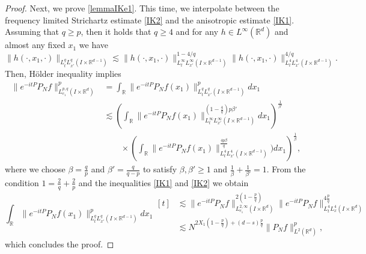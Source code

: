 \documentclass[aihp]{imsart}
\numberwithin{equation}{section}
\theoremstyle{plain}
\theoremstyle{remark}
\newcommand{\R}{\mathbb{R}}
\begin{document}
\begin{proof}
Next, we prove  \eqref{lemmaIKe1}. This time, we interpolate between the frequency limited Strichartz estimate \eqref{IK2} and the anisotropic estimate \eqref{IK1}. Assuming that $q \geq p$, then it holds that $q \geq 4$ and for any $h\in L^\infty (\R^d )$ and almost any fixed \(x_{1}\) we have
$$\|h (\cdot,x_{1},\cdot)\|_{L^q_{t}L^{q}_{x'} (I\times \R^{d-1})} \lesssim \|h(\cdot,x_{1},\cdot) \|_{L^\infty_{t}L^{\infty}_{x'} (I\times \R^{d-1} )}^{1-4/q} \|h(\cdot,x_{1},\cdot)\|_{L^4_{t}L^{4}_{x'} (I\times \R^{d-1} )}^{4/q}.$$
Then,  H\" older inequality implies
\begin{align*}
\big\|e^{-it P } P_N  f\big\|_{L^{p,q}_{e_{1}} (I\times\R^{d})}^{p}
&= \int_{\R} \big\|e^{-it P }  P_N f(x_{1}) \big\|_{L^q_{t}L^{q}_{x'} (I \times \R^{d-1})}^p dx_1
\\ 
&\lesssim \left(\int_\R \|e^{-it P }  P_N f(x_{1}) \|_{L^\infty_{t}L^{\infty}_{x'} (I\times \R^{d-1})}^{(1- \frac{4}{q})p \beta'} dx_{1} \right)^{\frac{1}{\beta'}}
\\ &\qquad \times \left(\int_{\R} \|e^{-it P }  P_N f(x_{1}) \|_{L^4_{t}L^{4}_{x'} (I\times \R^{d-1})}^{\frac{4p \beta}{q}}) dx_{1} \right)^{\frac{1}{\beta}},
\end{align*}
where we choose $\beta=\frac{q}{p}$ and $\beta' = \frac{q}{q-p}$ to satisfy \(\beta,\beta'\geq1\) and \(\frac{1}{\beta}+\frac{1}{\beta'}=1\). From the condition $1= \frac{2}{q} +\frac{2}{p}$ and the inequalities \eqref{IK1} and \eqref{IK2} we obtain
\begin{equation*}
\int_\R \|e^{-it P}  P_N f(x_{1}) \|_{L^q_{t}L^{q}_{x'} (I\times \R^{d-1})}^p dx_1
\begin{aligned}[t]
& \lesssim \|e^{-it P }  P_N f \|_{L^{2,\infty}_{e_{1}} (I\times \R^d )}^{2(1-\frac{p}{q})} \|e^{-it P }  P_N f \|_{L^4_{t}L^{4}_{x} (I\times \R^d)}^{4\frac{ p}{q}} \\
&\lesssim N^{2X_1 (1-\frac{p}{q}) +(d-s) \frac{p}{q} } \|P_N f\|_{L^2 (\R^d)}^p ,
\end{aligned}
\end{equation*}
which concludes the proof.
\end{proof}
\end{document}
